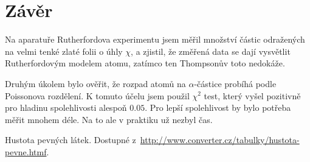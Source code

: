 \documentclass[a4paper,11pt]{article}
\begin{document}
\section{Závěr}

Na aparatuře Rutherfordova experimentu jsem měřil množství částic odražených na velmi tenké zlaté folii o úhly $ \chi $, a zjistil, že změřená data se dají vysvětlit Rutherfordovým modelem atomu, zatímco ten Thompsonův toto nedokáže. 

Druhým úkolem bylo ověřit, že rozpad atomů na $ \alpha $-částice probíhá podle Poissonova rozdělení. K tomuto účelu jsem použil $ \chi^2 $ test, který vyšel pozitivně pro hladinu spolehlivosti alespoň $ 0.05 $. Pro lepší spolehlivost by bylo potřeba měřit mnohem déle. Na to ale v praktiku už nezbyl čas. 

\begin{thebibliography}{0}
 Hustota pevných látek. Dostupné z~\url{http://www.converter.cz/tabulky/hustota-pevne.htmf}.   
\end{thebibliography}
\end{document}
